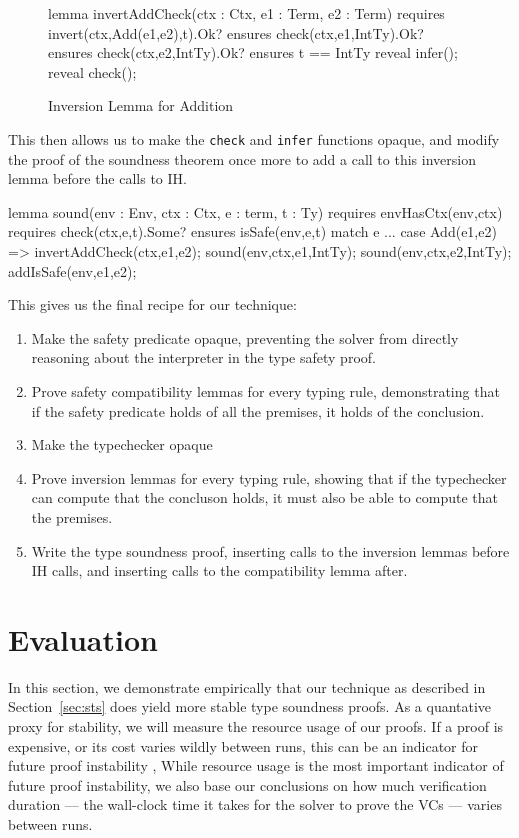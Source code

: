 \documentclass[sigplan,review,screen,anonymous]{acmart}
\begin{document}
\begin{figure}
\begin{dafny}
  lemma invertAddCheck(ctx : Ctx, e1 : Term, e2 : Term)
  requires invert(ctx,Add(e1,e2),t).Ok?
  ensures check(ctx,e1,IntTy).Ok?
  ensures check(ctx,e2,IntTy).Ok?
  ensures t == IntTy
{ reveal infer(); reveal check(); }
\end{dafny}

  \caption{Inversion Lemma for Addition}
  \label{fig:add-invert}
\end{figure}

This then allows us to make the \texttt{check} and \texttt{infer} functions opaque, and modify
the proof of the soundness theorem once more to add a call to this inversion lemma before the calls to IH.

\begin{dafny}
lemma sound(env : Env, ctx : Ctx, e : term, t : Ty)
  requires envHasCtx(env,ctx)
  requires check(ctx,e,t).Some?
  ensures isSafe(env,e,t)
{
  match e {
    ...
    case Add(e1,e2) =>
      invertAddCheck(ctx,e1,e2);
      sound(env,ctx,e1,IntTy);
      sound(env,ctx,e2,IntTy);
      addIsSafe(env,e1,e2);
  }
}
\end{dafny}

This gives us the final recipe for our technique:

\begin{enumerate}
  \item Make the safety predicate opaque, preventing the solver from directly reasoning about the interpreter in the type safety proof.
  \item Prove safety compatibility lemmas for every typing rule, demonstrating that if the safety predicate holds of all the premises, it holds of the conclusion.
  \item Make the typechecker opaque
  \item Prove inversion lemmas for every typing rule, showing that if the typechecker can compute that the concluson holds, it must also be able to compute that the premises.
  \item Write the type soundness proof, inserting calls to the inversion lemmas before IH calls, and inserting calls to the compatibility lemma after.
\end{enumerate}


\section{Evaluation}
\label{sec:eval}
In this section, we demonstrate empirically that our technique as described in Section~\ref{sec:sts}
does yield more stable type soundness proofs. As a quantative proxy for stability, we will measure
the resource usage of our proofs. If a proof is expensive, or its cost varies wildly
between runs, this can be an indicator for future proof instability \cite{stabilize},\cite{tomb}
While resource usage is the most important indicator of future proof instability, we also
base our conclusions on how much verification duration --- the wall-clock time it takes for the solver
to prove the VCs --- varies between runs.
\end{document}
